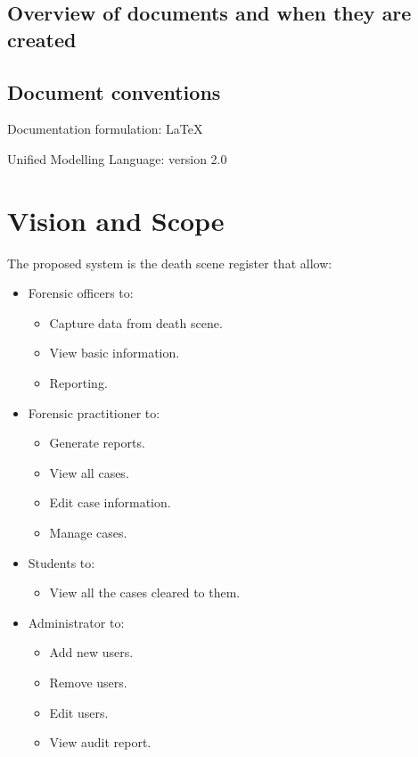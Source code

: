 \documentclass[10pt,a4paper]{article}
\begin{document}
\subsection{Overview of documents and when they are created}


\subsection{Document conventions}
\begin{description}
\item Documentation formulation: LaTeX
\item Unified Modelling Language: version 2.0
\end{description}

\section{Vision and Scope}
The proposed system is the death scene register that allow:
 \begin{itemize}
 \item Forensic officers to: 
	 \begin{itemize}
		\item Capture data from death scene.
		\item View basic information.
		\item Reporting.
	\end{itemize}
\item Forensic practitioner to:
	 \begin{itemize}
		\item Generate reports.
		\item View all cases.
		\item Edit case information.
		\item Manage cases.
	 \end{itemize}
\item Students to:
	 \begin{itemize}
		\item View all the cases cleared to them.
	 \end{itemize}
\item Administrator to:
	 \begin{itemize}
		\item Add new users.
		\item Remove users.
		\item Edit users.
		\item View audit report.
	 \end{itemize}
\end{itemize}
\end{document}
